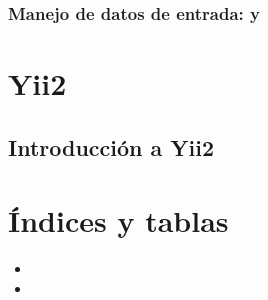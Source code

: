 \documentclass[a4paper,11pt,spanish]{sphinxmanual}
\begin{document}
\section{Manejo de datos de entrada:  y }
\label{\detokenize{php:manejo-de-datos-de-entrada-get-y-post}}

\part{Yii2}
\label{\detokenize{yii2:yii2}}\label{\detokenize{yii2::doc}}

\chapter{Introducción a Yii2}
\label{\detokenize{yii2:introduccion-a-yii2}}

\part{Índices y tablas}
\label{\detokenize{index:indices-y-tablas}}\begin{itemize}
\item {} 

\item {} 

\end{itemize}



\renewcommand{\indexname}{Índice}
\printindex
\end{document}
